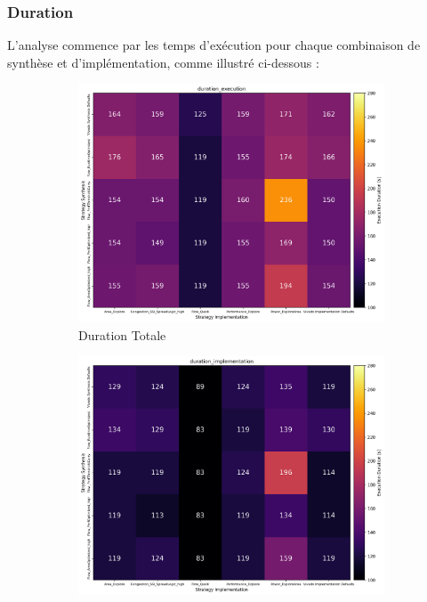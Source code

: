 \documentclass[../CSC_5RO07_TA.tex]{subfiles}
\begin{document}
\subsubsection{Duration}
\noindent L'analyse commence par les temps d'exécution pour chaque combinaison de synthèse et d'implémentation, comme illustré ci-dessous :
\begin{figure}[h]
    \centering
    \begin{subfigure}[b]{0.30\textwidth}
        \centering
        \includegraphics[width=\linewidth]{images/2_duration_execution.png}
        \caption{Duration Totale}
        \label{fig:duration_total_2}
    \end{subfigure}\hfill
	\begin{subfigure}[b]{0.30\textwidth}
        \centering
        \includegraphics[width=\linewidth]{images/2_duration_implementation.png}

\end{subfigure}
\end{figure}
\end{document}
